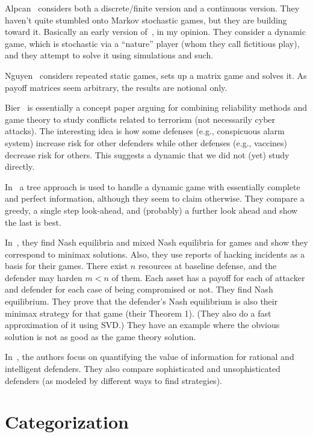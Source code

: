 \documentclass{sig-alternate}
\begin{document}
Alpcan~\cite{alpcan2004game} considers both a discrete/finite version
and a continuous version. They haven't quite stumbled onto Markov
stochastic games, but they are building toward it. Basically an early
version of~\cite{alpcan2006intrusion}, in my opinion. They consider a
dynamic game, which is stochastic via a ``nature'' player (whom they
call fictitious play), and they attempt to solve it using simulations
and such.

Nguyen~\cite{nguyen2009security} considers repeated static games,
sets up a matrix game and solves it. As payoff matrices seem
arbitrary, the results are notional only.

Bier~\cite{bier2006game} is essentially a concept paper arguing for
combining reliability methods and game theory to study conflicts
related to terrorism (not necessarily cyber attacks). The interesting
idea is how some defenses (e.g., conspicuous alarm system) increase
risk for other defenders while other defenses (e.g., vaccines)
decrease risk for others. This suggests a dynamic that we did not
(yet) study directly.

In~\cite{luo2010game} a tree approach is used to handle a dynamic game
with essentially complete and perfect information, although they seem
to claim otherwise. They compare a greedy, a single step look-ahead,
and (probably) a further look ahead and show the last is best.

In~\cite{fielder2014game}, they find Nash equilibria and mixed Nash
equilibria for games and show they correspond to minimax
solutions. Also, they use reports of hacking incidents as a basis for
their games. There exist $n$ resources at baseline defense, and the
defender may harden $m < n$ of them. Each asset has a payoff for each
of attacker and defender for each case of being compromised or
not. They find Nash equilibrium. They prove that the defender's Nash
equilibrium is also their minimax strategy for that game (their
Theorem 1). (They also do a fast approximation of it using SVD.) They
have an example where the obvious solution is not as good as the game
theory solution.

In~\cite{grossklags2009uncertainty}, the authors focus on  quantifying
the value of information for rational and intelligent defenders. They
also compare sophisticated and unsophisticated defenders (as modeled
by different ways to find strategies).

\section{Categorization}
\end{document}

